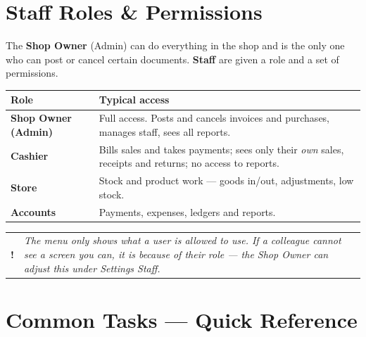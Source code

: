\documentclass[11pt,a4paper]{article}
\makeatletter
\newcommand{\role}[1]{\textbf{\color{brand}#1}}
\newcommand{\menu}[1]{\textsf{#1}}
\newenvironment{note}
  {\par\medskip\noindent\begin{tabular}{@{}p{0.03\textwidth}p{0.9\textwidth}@{}}
   \textbf{!} & \itshape}
  {\end{tabular}\par\medskip}
\makeatother
\begin{document}
\clearpage
\section{Staff Roles \& Permissions}\label{sec:roles}

The \role{Shop Owner} (Admin) can do everything in the shop and is the only one
who can post or cancel certain documents. \role{Staff} are given a role and a set
of permissions.

\begin{center}
\begin{tabularx}{\textwidth}{@{}p{}L@{}}
\toprule
\textbf{Role} & \textbf{Typical access} \\
\midrule
\role{Shop Owner (Admin)} &
Full access. Posts and cancels invoices and purchases, manages staff, sees all
reports. \\[4pt]
\role{Cashier} &
Bills sales and takes payments; sees only their \emph{own} sales, receipts and
returns; no access to reports. \\[4pt]
\role{Store} &
Stock and product work --- goods in/out, adjustments, low stock. \\[4pt]
\role{Accounts} &
Payments, expenses, ledgers and reports. \\
\bottomrule
\end{tabularx}
\end{center}

\begin{note}
The menu only shows what a user is allowed to use. If a colleague cannot see a
screen you can, it is because of their role --- the Shop Owner can adjust this
under \menu{Settings \textrightarrow{} Staff}.
\end{note}

\clearpage
\section{Common Tasks --- Quick Reference}
\end{document}
